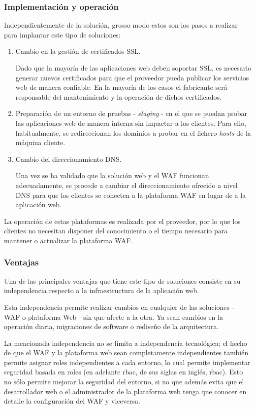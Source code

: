 \subsubsection{Implementación y operación}
\par Independientemente de la solución, grosso modo estos son los pasos a realizar para implantar este tipo de soluciones:
\begin{enumerate}
  \item Cambio en la gestión de certificados SSL.
    \par Dado que la mayoría de las aplicaciones web deben soportar SSL, es necesario generar nuevos certificados para que el proveedor pueda
    publicar los servicios web de manera confiable. En la mayoría de los casos el fabricante será responsable del mantenimiento y la operación
    de dichos certificados.
  \item Preparación de un entorno de pruebas - {\em staging} - en el que se puedan probar las aplicaciones web de manera interna sin impactar
    a los clientes. Para ello, habitualmente, se redireccionan los dominios a probar en el fichero {\em hosts} de la máquina cliente.
  \item Cambio del direccionamiento DNS.
    \par Una vez se ha validado que la solución web y el WAF funcionan adecuadamente, se procede a cambiar el direccionamiento ofrecido a nivel
    DNS para que los clientes se conecten a la plataforma WAF en lugar de a la aplicación web.
\end{enumerate}

\par La operación de estas plataformas es realizada por el proveedor, por lo que los clientes no necesitan disponer del conocimiento o el
tiempo necesario para mantener o actualizar la plataforma WAF.

\subsubsection{Ventajas}
\par Una de las principales ventajas que tiene este tipo de soluciones consiste en su independencia respecto a la infraestructura de la
aplicación web.
\par Esta independencia permite realizar cambios en cualquier de las soluciones - WAF o plataforma Web - sin que afecte a la otra. Ya sean
cambios en la operación diaria, migraciones de software o rediseño de la arquitectura.
\par La mencionada independencia no se limita a independencia tecnológica; el hecho de que el WAF y la plataforma web sean completamente
independientes también permite asignar roles independientes a cada entorno, lo cual permite implementar seguridad basada en roles (en adelante
\acrshort{rbac}, de sus siglas en inglés, \acrlong{rbac}). Esto no sólo permite mejorar la seguridad del entorno, si no que además evita
que el desarrollador web o el administrador de la plataforma web tenga que conocer en detalle la configuración del WAF y viceversa.


